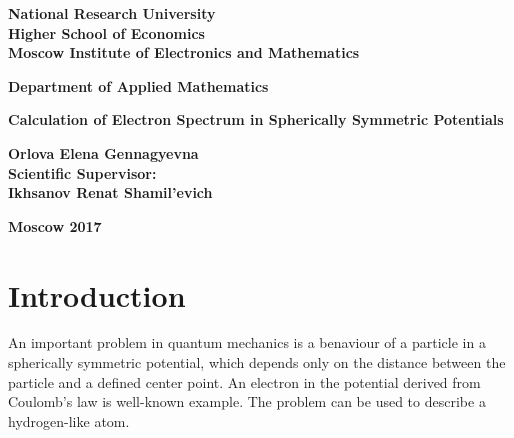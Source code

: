 \documentclass[a4paper, 12pt]{article}
\begin{document}
	\begin{center}
		\large
		\textbf{National Research University}			
		\\
		\textbf{Higher School of Economics}									\\[3 cm]
		\textbf{Moscow Institute of Electronics and Mathematics}			\\[2 cm]
									
	\end{center}
	
	\begin{center}
		\large
		\textbf{Department of Applied Mathematics}		\\[3 cm]
	\end{center}
	
	
	
	\begin{center}
		\large
		\textbf{Calculation of Electron Spectrum in Spherically Symmetric Potentials}		\\[6 cm]
		
	\end{center}
	
	\begin{flushright}
		\large
		\textbf{Orlova Elena Gennagyevna}				\\
		\textbf{Scientific Supervisor:}			\\
		\textbf{Ikhsanov Renat Shamil’evich}		\\
	\end{flushright}
	
	\vfill
	\begin{center}
		\large
		\textbf{Moscow 2017}
	\end{center}
	\pagebreak
	
	
	
		
\section{Introduction}

An important problem in quantum mechanics is a benaviour of a particle in a spherically symmetric potential, which depends only on the distance between the particle and a defined center point. An electron in the potential derived from Coulomb's law is well-known example. The problem can be used to describe a hydrogen-like atom. 
\end{document}
